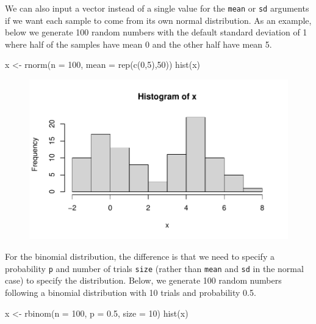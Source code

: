 \documentclass[
  letterpaper,
]{krantz}
\makeatletter
\newenvironment{Shaded}{\begin{snugshade}}{\end{snugshade}}
\newcommand{\AttributeTok}[1]{\textcolor[rgb]{0.40,0.45,0.13}{#1}}
\newcommand{\DecValTok}[1]{\textcolor[rgb]{0.68,0.00,0.00}{#1}}
\newcommand{\FloatTok}[1]{\textcolor[rgb]{0.68,0.00,0.00}{#1}}
\newcommand{\FunctionTok}[1]{\textcolor[rgb]{0.28,0.35,0.67}{#1}}
\newcommand{\NormalTok}[1]{\textcolor[rgb]{0.00,0.23,0.31}{#1}}
\newcommand{\OtherTok}[1]{\textcolor[rgb]{0.00,0.23,0.31}{#1}}
\newenvironment{kframe}{%
\medskip{}
\setlength{\fboxsep}{.8em}
 \def\at@end@of@kframe{}%
 \ifinner\ifhmode%
  \def\at@end@of@kframe{\end{minipage}}%
  \begin{minipage}{\columnwidth}%
 \fi\fi%
 \def\FrameCommand##1{\hskip\@totalleftmargin \hskip-\fboxsep
 \colorbox{shadecolor}{##1}\hskip-\fboxsep
     \hskip-\linewidth \hskip-\@totalleftmargin \hskip\columnwidth}%
 \MakeFramed {\advance\hsize-\width
   \@totalleftmargin\z@ \linewidth\hsize
   \@setminipage}}%
 {\par\unskip\endMakeFramed%
 \at@end@of@kframe}
\renewenvironment{Shaded}{\begin{kframe}}{\end{kframe}}
\makeatother
\begin{document}
We can also input a vector instead of a single value for the
\texttt{mean} or \texttt{sd} arguments if we want each sample to come
from its own normal distribution. As an example, below we generate 100
random numbers with the default standard deviation of 1 where half of
the samples have mean 0 and the other half have mean 5.

\begin{Shaded}
\begin{Highlighting}[]
\NormalTok{x }\OtherTok{\textless{}{-}} \FunctionTok{rnorm}\NormalTok{(}\AttributeTok{n =} \DecValTok{100}\NormalTok{, }\AttributeTok{mean =} \FunctionTok{rep}\NormalTok{(}\FunctionTok{c}\NormalTok{(}\DecValTok{0}\NormalTok{,}\DecValTok{5}\NormalTok{),}\DecValTok{50}\NormalTok{))}
\FunctionTok{hist}\NormalTok{(x)}
\end{Highlighting}
\end{Shaded}

\begin{figure}[H]

{\centering \includegraphics[width=1\textwidth,height=\textheight]{book/8_distributions_files/figure-pdf/unnamed-chunk-5-1.pdf}

}

\end{figure}

For the binomial distribution, the difference is that we need to specify
a probability \texttt{p} and number of trials \texttt{size} (rather than
\texttt{mean} and \texttt{sd} in the normal case) to specify the
distribution. Below, we generate 100 random numbers following a binomial
distribution with 10 trials and probability 0.5.

\begin{Shaded}
\begin{Highlighting}[]
\NormalTok{x }\OtherTok{\textless{}{-}} \FunctionTok{rbinom}\NormalTok{(}\AttributeTok{n =} \DecValTok{100}\NormalTok{, }\AttributeTok{p =} \FloatTok{0.5}\NormalTok{, }\AttributeTok{size =} \DecValTok{10}\NormalTok{)}
\FunctionTok{hist}\NormalTok{(x)}
\end{Highlighting}
\end{Shaded}
\end{document}
